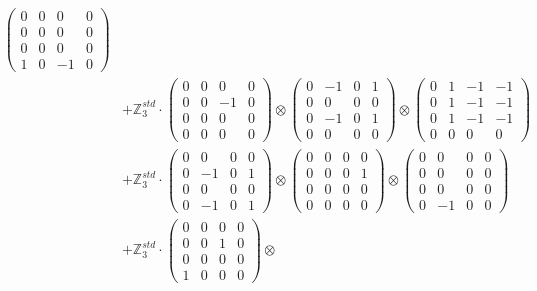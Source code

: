 \documentclass{article}
\begin{document}
{\begin{align}
            \begin{pmatrix} 0 & 0 & 0 & 0 \\ 0 & 0 & 0 & 0 \\ 0 & 0 & 0 & 0 \\ 1 & 0 & -1 & 0 \end{pmatrix} \\ 
        &+ \label{Rs16-Rc11-Solution-25-c25} \mathbb{Z}_3^{std} \cdot 
            \begin{pmatrix} 0 & 0 & 0 & 0 \\ 0 & 0 & -1 & 0 \\ 0 & 0 & 0 & 0 \\ 0 & 0 & 0 & 0 \end{pmatrix} \otimes 
            \begin{pmatrix} 0 & -1 & 0 & 1 \\ 0 & 0 & 0 & 0 \\ 0 & -1 & 0 & 1 \\ 0 & 0 & 0 & 0 \end{pmatrix} \otimes 
            \begin{pmatrix} 0 & 1 & -1 & -1 \\ 0 & 1 & -1 & -1 \\ 0 & 1 & -1 & -1 \\ 0 & 0 & 0 & 0 \end{pmatrix} \\ 
        &+ \label{Rs16-Rc11-Solution-25-c26} \mathbb{Z}_3^{std} \cdot 
            \begin{pmatrix} 0 & 0 & 0 & 0 \\ 0 & -1 & 0 & 1 \\ 0 & 0 & 0 & 0 \\ 0 & -1 & 0 & 1 \end{pmatrix} \otimes 
            \begin{pmatrix} 0 & 0 & 0 & 0 \\ 0 & 0 & 0 & 1 \\ 0 & 0 & 0 & 0 \\ 0 & 0 & 0 & 0 \end{pmatrix} \otimes 
            \begin{pmatrix} 0 & 0 & 0 & 0 \\ 0 & 0 & 0 & 0 \\ 0 & 0 & 0 & 0 \\ 0 & -1 & 0 & 0 \end{pmatrix} \\ 
        &+ \label{Rs16-Rc11-Solution-25-c27} \mathbb{Z}_3^{std} \cdot 
            \begin{pmatrix} 0 & 0 & 0 & 0 \\ 0 & 0 & 1 & 0 \\ 0 & 0 & 0 & 0 \\ 1 & 0 & 0 & 0 \end{pmatrix} \otimes 

\end{align}}
\end{document}
